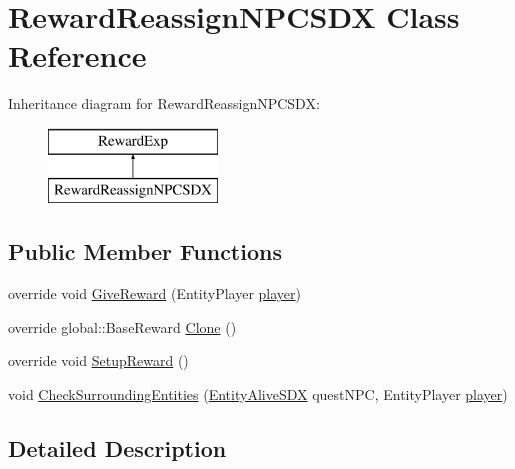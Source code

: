 \hypertarget{class_reward_reassign_n_p_c_s_d_x}{}\section{Reward\+Reassign\+N\+P\+C\+S\+DX Class Reference}
\label{class_reward_reassign_n_p_c_s_d_x}
Inheritance diagram for Reward\+Reassign\+N\+P\+C\+S\+DX\+:\begin{figure}[H]
\begin{center}
\leavevmode
\includegraphics[height=2.000000cm]{class_reward_reassign_n_p_c_s_d_x}
\end{center}
\end{figure}
\subsection*{Public Member Functions}
\begin{DoxyCompactItemize}
\item 
override void \mbox{\hyperlink{class_reward_reassign_n_p_c_s_d_x_a8433652ccfadd1af0de4179945a86092}{Give\+Reward}} (Entity\+Player \mbox{\hyperlink{_sphere_i_i_01_music_01_boxes_2_config_2_localization_8txt_a4e2cb8aeff651600ea1cc57fe5a929a4}{player}})
\item 
override global\+::\+Base\+Reward \mbox{\hyperlink{class_reward_reassign_n_p_c_s_d_x_ab066d21f87e829a62a67da0d347b346c}{Clone}} ()
\item 
override void \mbox{\hyperlink{class_reward_reassign_n_p_c_s_d_x_ae7d0652d2c3443333ef0e7fbff2dd27c}{Setup\+Reward}} ()
\item 
void \mbox{\hyperlink{class_reward_reassign_n_p_c_s_d_x_a3b469f6ce06b7a05b7a680fabb8fe5ad}{Check\+Surrounding\+Entities}} (\mbox{\hyperlink{class_entity_alive_s_d_x}{Entity\+Alive\+S\+DX}} quest\+N\+PC, Entity\+Player \mbox{\hyperlink{_sphere_i_i_01_music_01_boxes_2_config_2_localization_8txt_a4e2cb8aeff651600ea1cc57fe5a929a4}{player}})
\end{DoxyCompactItemize}


\subsection{Detailed Description}



